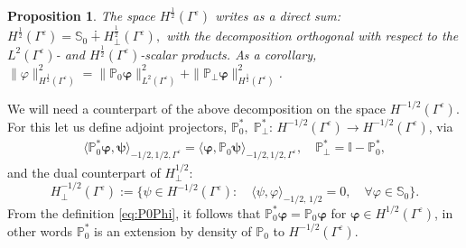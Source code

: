 \documentclass[]{article}
\newtheorem{proposition}{Proposition}
\numberwithin{equation}{section}
\numberwithin{theorem}{section}
\numberwithin{lemma}{section}
\numberwithin{corollary}{section}
\numberwithin{proposition}{section}
\numberwithin{definition}{section}
\newcommand{\re}{\varepsilon}
\renewcommand{\vec}{\boldsymbol}
\begin{document}
	\begin{proposition}
		\label{prop:norm_equivalence} 
		The space $H^{\frac{1}{2}}(\Gamma^{\re})$ writes as a direct sum: $
		H^{\frac{1}{2}}(\Gamma^{\re}) = \mathbb{S}_0\dotplus H^{\frac{1}{2}}_{\perp} (\Gamma^{\re}),
		$ 
		with the decomposition orthogonal with respect to the $L^2(\Gamma^{\re})$- and $H^{\frac{1}{2}}(\Gamma^{\re})$-scalar products. As a corollary, 
		$\|\varphi\|^2_{H^{\frac{1}{2}}(\Gamma^{\re})}=\|\mathbb{P}_0\vec{\varphi}\|_{L^2(\Gamma^{\re})}^2+\|\mathbb{P}_{\perp}\vec{\varphi}\|_{H^{\frac{1}{2}}(\Gamma^{\re})}^2$. %
	\end{proposition}
	We will need a counterpart of the above decomposition on the space $H^{-1/2}(\Gamma^{\re})$. For this let us define adjoint projectors, $\mathbb{P}_0^*,\; \mathbb{P}_{\perp}^*: \, H^{-1/2}(\Gamma^{\re})\rightarrow H^{-1/2}(\Gamma^{\re})$, via 
	\begin{align}
		\label{eq:P0Phi}
		\langle \mathbb{P}_0^*\vec{\varphi}, \vec{\psi}\rangle_{-1/2,1/2,\Gamma^{\re}}=\langle \vec{\varphi}, \mathbb{P}_0\vec{\psi}\rangle_{-1/2,1/2,\Gamma^{\re}}, \quad \mathbb{P}_{\perp}^*=\mathbb{I}-\mathbb{P}_0^*,
	\end{align}
	and the dual counterpart of $H^{1/2}_{\perp}$:
	$$H^{-1/2}_{\perp} (\Gamma^{\re}) := \{ \psi \in H^{-1/2}(\Gamma^{\re}):\quad \langle \psi, \varphi \rangle_{-1/2, \, 1/2} =0, \quad \forall \varphi\in \mathbb{S}_0\}. $$
	From the definition \eqref{eq:P0Phi}, it follows that  $\mathbb{P}_0^*\vec{\varphi}=\mathbb{P}_0\vec{\varphi}$ for $\vec{\varphi}\in H^{1/2}(\Gamma^{\re})$, in other words $\mathbb{P}_0^*$ is an extension by density of $\mathbb{P}_0$ to $H^{-1/2}(\Gamma^{\re})$.
	
\end{document}

